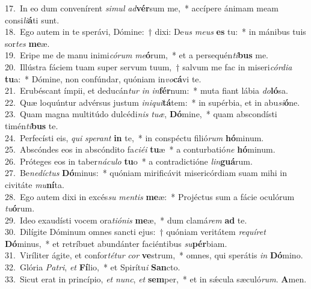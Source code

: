 {17.~}In eo dum convenírent \textit{si}\textit{mul} \textit{ad}\textbf{vér}sum me,~* accípere ánimam meam consi\textit{li}\textbf{á}ti sunt.\\
{18.~}Ego autem in te sperávi, Dómine:~† dixi: De\textit{us} \textit{me}\textit{us} \textbf{es} tu:~* in mánibus tuis sor\textit{tes} \textbf{me}æ.\\
{19.~}Eripe me de manu inimi\textit{có}\textit{rum} \textit{me}\textbf{ó}rum,~* et a persequén\textit{ti}\textbf{bus} me.\\
{20.~}Illústra fáciem tuam super servum tuum,~† salvum me fac in miseri\textit{cór}\textit{di}\textit{a} \textbf{tu}a:~* Dómine, non confúndar, quóniam in\textit{vo}\textbf{cá}vi te.\\
{21.~}Erubéscant ímpii, et deducán\textit{tur} \textit{in} \textit{in}\textbf{fér}num:~* muta fiant lábia \textit{do}\textbf{ló}sa.\\
{22.~}Quæ loquúntur advérsus justum \textit{i}\textit{ni}\textit{qui}\textbf{tá}tem:~* in supérbia, et in abu\textit{si}\textbf{ó}ne.\\
{23.~}Quam magna multitúdo dulcédi\textit{nis} \textit{tu}\textit{æ}, \textbf{Dó}mine,~* quam abscondísti timén\textit{ti}\textbf{bus} te.\\
{24.~}Perfecísti eis, \textit{qui} \textit{spe}\textit{rant} \textbf{in} te,~* in conspéctu filió\textit{rum} \textbf{hó}minum.\\
{25.~}Abscóndes eos in abscóndito fa\textit{ci}\textit{é}\textit{i} \textbf{tu}æ~* a conturbatió\textit{ne} \textbf{hó}minum.\\
{26.~}Próteges eos in taber\textit{ná}\textit{cu}\textit{lo} \textbf{tu}o~* a contradictióne \textit{lin}\textbf{guá}rum.\\
{27.~}Be\textit{ne}\textit{dí}\textit{ctus} \textbf{Dó}minus:~* quóniam mirificávit misericórdiam suam mihi in civitáte \textit{mu}\textbf{ní}ta.\\
{28.~}Ego autem dixi in excés\textit{su} \textit{men}\textit{tis} \textbf{me}æ:~* Projéctus sum a fácie oculórum \textit{tu}\textbf{ó}rum.\\
{29.~}Ideo exaudísti vocem ora\textit{ti}\textit{ó}\textit{nis} \textbf{me}æ,~* dum clamá\textit{rem} \textbf{ad} te.\\
{30.~}Dilígite Dóminum omnes sancti ejus:~† quóniam veritátem \textit{re}\textit{quí}\textit{ret} \textbf{Dó}minus,~* et retríbuet abundánter faciéntibus \textit{su}\textbf{pér}biam.\\
{31.~}Viríliter ágite, et confor\textit{té}\textit{tur} \textit{cor} \textbf{ve}strum,~* omnes, qui sperátis \textit{in} \textbf{Dó}mino.\\
{32.~}Glória \textit{Pa}\textit{tri}, \textit{et} \textbf{Fí}lio,~* et Spirítu\textit{i} \textbf{San}cto.\\
{33.~}Sicut erat in princípio, \textit{et} \textit{nunc}, \textit{et} \textbf{sem}per,~* et in sǽcula sæculó\textit{rum}. \textbf{A}men.\\
